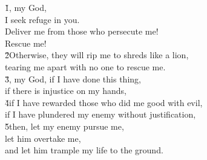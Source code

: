 \begin{poetry}
\poeml \v{1}, my God, \\
\poemll    I seek refuge in you. \\
\poeml Deliver me from those who persecute me! \\
\poemll    Rescue me! \\
\poeml \v{2}Otherwise, they will rip me to shreds like a lion, \\
\poemll    tearing me apart with no one to rescue me. \\
\poeml \v{3}, my God, if I have done this thing, \\
\poemll    if there is injustice on my hands, \\
\poeml \v{4}if I have rewarded those who did me good with evil, \\
\poemll    if I have plundered my enemy without justification, \\
\poeml \v{5}then, let my enemy pursue me, \\
\poemll    let him overtake me, \\
\poemlll       and let him trample my life to the ground.
\end{poetry}

